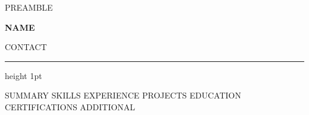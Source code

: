 %
%
{{PREAMBLE}}


\renewcommand{\cvsectionfont}[1]{{\large\bfseries #1}}
\renewcommand{\cvsectionrule}{\vspace{2pt}\hrule height 0.8pt\relax}

\renewcommand{\cvheader}[2]{%
  \begin{center}
    {\fontsize{22}{25}\selectfont\bfseries #1}\par\vspace{4pt}%
    {\small #2}\par
  \end{center}
  \vspace{-2pt}%
  \hrule height 1pt
  \vspace{2pt}%
}



\cvheader{ {{NAME}} }{ {{CONTACT}} }

{{SUMMARY}}
{{SKILLS}}
{{EXPERIENCE}}
{{PROJECTS}}
{{EDUCATION}}
{{CERTIFICATIONS}}
{{ADDITIONAL}}


